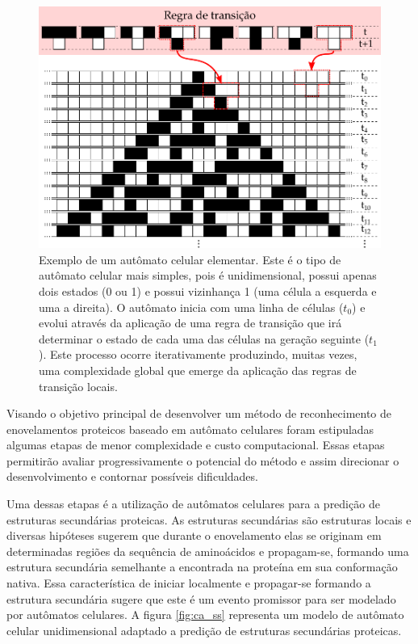 \begin{figure}[h]
	\includegraphics[width=1\linewidth]{ca_final}
	\caption{Exemplo de um autômato celular elementar. Este é o tipo de autômato celular mais simples, pois é unidimensional, possui apenas dois estados (0 ou 1) e possui vizinhança 1 (uma célula a esquerda e uma a direita). O autômato inicia com uma linha de células ($t_{0}$) e evolui através da aplicação de uma regra de transição que irá determinar o estado de cada uma das células na geração seguinte ($t_{1}$). Este processo ocorre iterativamente produzindo, muitas vezes, uma complexidade global que emerge da aplicação das regras de transição locais.}
	\label{fig:ca}
\end{figure}

Visando o objetivo principal de desenvolver um método de reconhecimento de enovelamentos proteicos baseado em autômato celulares foram estipuladas algumas etapas de menor complexidade e custo computacional. Essas etapas permitirão avaliar progressivamente o potencial do método e assim direcionar o desenvolvimento e contornar possíveis dificuldades.

Uma dessas etapas é a utilização de autômatos celulares para a predição de estruturas secundárias proteicas. As estruturas secundárias são estruturas locais e diversas hipóteses sugerem que durante o enovelamento elas se originam em determinadas regiões da sequência de aminoácidos e propagam-se, formando uma estrutura secundária semelhante a encontrada na proteína em sua conformação nativa. Essa característica de iniciar localmente e propagar-se formando a estrutura secundária sugere que este é um evento promissor para ser modelado por autômatos celulares. A figura \ref{fig:ca_ss} representa um modelo de autômato celular unidimensional adaptado a predição de estruturas secundárias proteicas.


